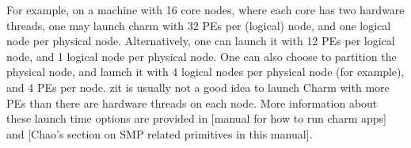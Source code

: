 For example, on a machine with 16 core nodes, where each core has two
hardware threads, one may launch charm with 32 PEs per (logical) node,
and one logical node per physical node. Alternatively, one can launch
it with 12 PEs per logical node, and 1 logical node per physical
node. One can also choose to partition the physical node, and launch
it with 4 logical nodes per physical node (for example), and 4 PEs per
node. zit is usually not a good idea to launch Charm with more PEs
than there are hardware threads on each node. More information about
these launch time options are provided in [manual for how to run charm
apps] and [Chao's section on SMP related primitives in this manual].

